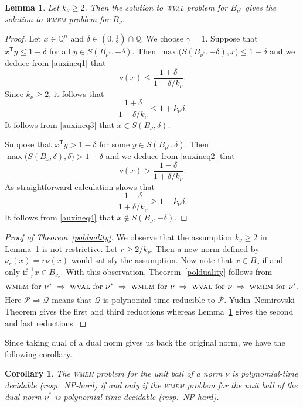 \documentclass[11pt,reqno]{amsart}
\newtheorem{lemma}[theorem]{Lemma}
\newtheorem{corollary}[theorem]{Corollary}
\theoremstyle{definition}
\theoremstyle{remark}
\begin{document}
\begin{lemma}\label{wmemwval} Let $k_\nu\ge 2$.  Then the solution to \textsc{wval} problem for $B_{\nu^*}$ gives the solution to \textsc{wmem} problem for $B_\nu$.
\end{lemma}
\begin{proof} Let $x\in\mathbb{Q}^n$ and  $\delta\in (0, \frac{1}{2})\cap \mathbb{Q}$.  We choose $\gamma=1$.
Suppose that $x^\mathsf{T} y\le 1+ \delta$ for all $y\in S(B_{\nu^*},-\delta)$.  Then $\max\bigl(S(B_{\nu^*},-\delta),x\bigr)\le 1+\delta$  and we  deduce from \eqref{auxineq1}  that
\[
\nu(x)\le \frac{1+\delta}{1-\delta/k_\nu}.
\]
Since $k_\nu\ge 2$, it follows  that
\[
\frac{1+\delta}{1-\delta/k_\nu}\le
1+k_\nu\delta.
\]
It follows from \eqref{auxineq3} that $x\in S(B_\nu,\delta)$.

Suppose that $x^\mathsf{T} y> 1- \delta$ for some $y\in S(B_{\nu^*},\delta)$. Then $\max\bigl(S(B_{\nu},\delta),\delta\bigr)>1-\delta$ and we deduce from \eqref{auxineq2}  that
\[
\nu(x)> \frac{1-\delta}{1+ \delta/k_\nu}.
\]
As straightforward calculation shows that
\[
\frac{1-\delta}{1+ \delta/k_\nu }\ge 1-k_\nu\delta.
\]
It follows from \eqref{auxineq4} that $x\notin S(B_\nu,-\delta)$.   
\end{proof} 

\begin{proof}[Proof of Theorem~\ref{polduality}]
We observe that the assumption $k_\nu\ge 2$ in Lemma~\ref{wmemwval} is not restrictive. Let $r\ge 2/k_\nu$.  Then a new norm defined by $ \nu_r(x)=r\nu(x)$ would satisfy the assumption.
Now note that $x\in B_\nu$ if and only if $\frac{1}{r}x\in B_{\nu_r}$.  With this observation,
Theorem~\ref{polduality} follows from
\[
\text{\textsc{wmem} for }\nu^* \; \Rightarrow \; 
\text{\textsc{wval} for }\nu^* \; \Rightarrow \; 
\text{\textsc{wmem} for }\nu \; \Rightarrow \; 
\text{\textsc{wval} for }\nu \; \Rightarrow \; 
\text{\textsc{wmem} for }\nu^*.
\]
Here $\mathscr{P} \Rightarrow \mathscr{Q}$ means that $\mathscr{Q}$ is polynomial-time reducible to $\mathscr{P}$. Yudin--Nemirovski Theorem gives the first and third reductions whereas Lemma~\ref{wmemwval} gives the second and last reductions.
\end{proof}

Since taking dual of a dual norm gives us back the original norm, we have the following corollary.
\begin{corollary}
The \textsc{wmem} problem for the unit ball of a norm $\nu$  is polynomial-time decidable (resp.\ NP-hard)
if and only if the \textsc{wmem} problem for the unit ball of the dual norm $\nu^*$ is polynomial-time decidable (resp.\ NP-hard).
\end{corollary}
\end{document}
